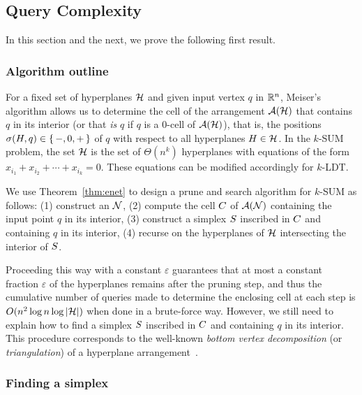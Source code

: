 \subsection{Query Complexity}%
\label{paper:ksum-algorithm:contrib:query-complexity}

In this section and the next, we prove the following first result.
\TheoremKSUMCube*

\subsubsection{Algorithm outline}
For a fixed set of hyperplanes \(\mathcal{H}\) and given input vertex \(q\) in \(\mathbb{R}^n\),
Meiser's algorithm allows us to determine the cell of the arrangement
$\mathcal{A}(\mathcal{H})$ that contains $q$ in its interior (or that \emph{is} $q$ if
$q$ is a $0$-cell of $\mathcal{A}(\mathcal{H})$), that is, the positions $\sigma(H,q) \in
\left\{\,{-, 0, +}\,\right\}$ of \(q\) with respect to all hyperplanes $H \in \mathcal{H}$. In the \(k\)-SUM
problem, the set $\mathcal{H}$ is the set of $\Theta(n^k)$ hyperplanes with equations of the
form $x_{i_1} + x_{i_2} + \cdots + x_{i_k} = 0$.
These equations can be modified accordingly for \(k\)-LDT.

We use Theorem~\ref{thm:enet} to design a prune and search algorithm for
\(k\)-SUM as follows:
(1) construct an \enet{} \(\mathcal{N}\),
(2) compute the cell \(C\) of \(\mathcal{A}(\mathcal{N})\) containing the input
point $q$ in its interior,
(3) construct a simplex \(S\) inscribed in \(C\) and containing
\(q\) in its interior,
(4) recurse on the hyperplanes of \(\mathcal{H}\) intersecting the interior of
\(S\).

Proceeding this way with a constant $\varepsilon$ guarantees that at most a
constant fraction \(\varepsilon\) of the hyperplanes remains after the pruning step,
and thus the cumulative number of queries made to determine the enclosing cell at
each step is $O(n^2 \log n \log |{\mathcal{H}}|)$ when done in a brute-force way.
However, we still need to explain how to find a simplex \(S\) inscribed
in \(C\) and containing \(q\) in its interior. This procedure corresponds to the well-known
\emph{bottom vertex decomposition} (or \emph{triangulation}) of a hyperplane
arrangement~\cite{GO04,Cla88}.

\subsubsection{Finding a simplex}

